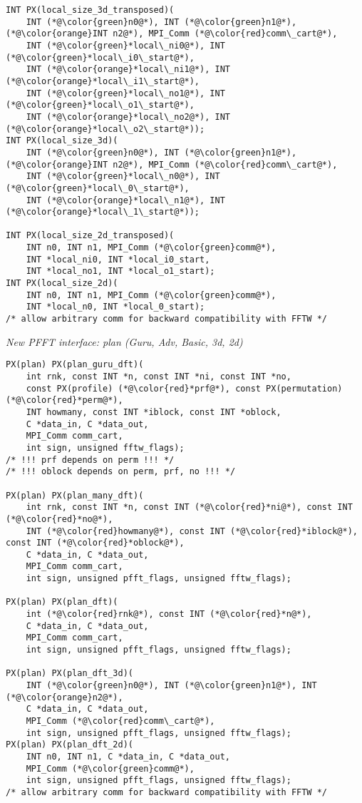 \begin{lstlisting}
INT PX(local_size_3d_transposed)(
    INT (*@\color{green}n0@*), INT (*@\color{green}n1@*), (*@\color{orange}INT n2@*), MPI_Comm (*@\color{red}comm\_cart@*),
    INT (*@\color{green}*local\_ni0@*), INT (*@\color{green}*local\_i0\_start@*),
    INT (*@\color{orange}*local\_ni1@*), INT (*@\color{orange}*local\_i1\_start@*),
    INT (*@\color{green}*local\_no1@*), INT (*@\color{green}*local\_o1\_start@*),
    INT (*@\color{orange}*local\_no2@*), INT (*@\color{orange}*local\_o2\_start@*));
INT PX(local_size_3d)(
    INT (*@\color{green}n0@*), INT (*@\color{green}n1@*), (*@\color{orange}INT n2@*), MPI_Comm (*@\color{red}comm\_cart@*),
    INT (*@\color{green}*local\_n0@*), INT (*@\color{green}*local\_0\_start@*),
    INT (*@\color{orange}*local\_n1@*), INT (*@\color{orange}*local\_1\_start@*));

INT PX(local_size_2d_transposed)(
    INT n0, INT n1, MPI_Comm (*@\color{green}comm@*),
    INT *local_ni0, INT *local_i0_start,
    INT *local_no1, INT *local_o1_start);
INT PX(local_size_2d)(
    INT n0, INT n1, MPI_Comm (*@\color{green}comm@*),
    INT *local_n0, INT *local_0_start);
/* allow arbitrary comm for backward compatibility with FFTW */
\end{lstlisting}


\emph{New PFFT interface: plan (Guru, Adv, Basic, 3d, 2d)}
\begin{lstlisting}
PX(plan) PX(plan_guru_dft)(
    int rnk, const INT *n, const INT *ni, const INT *no,
    const PX(profile) (*@\color{red}*prf@*), const PX(permutation) (*@\color{red}*perm@*),
    INT howmany, const INT *iblock, const INT *oblock,
    C *data_in, C *data_out,
    MPI_Comm comm_cart,
    int sign, unsigned fftw_flags);
/* !!! prf depends on perm !!! */
/* !!! oblock depends on perm, prf, no !!! */

PX(plan) PX(plan_many_dft)(
    int rnk, const INT *n, const INT (*@\color{red}*ni@*), const INT (*@\color{red}*no@*),
    INT (*@\color{red}howmany@*), const INT (*@\color{red}*iblock@*), const INT (*@\color{red}*oblock@*),
    C *data_in, C *data_out,
    MPI_Comm comm_cart,
    int sign, unsigned pfft_flags, unsigned fftw_flags);

PX(plan) PX(plan_dft)(
    int (*@\color{red}rnk@*), const INT (*@\color{red}*n@*),
    C *data_in, C *data_out,
    MPI_Comm comm_cart,
    int sign, unsigned pfft_flags, unsigned fftw_flags);

PX(plan) PX(plan_dft_3d)(
    INT (*@\color{green}n0@*), INT (*@\color{green}n1@*), INT (*@\color{orange}n2@*),
    C *data_in, C *data_out,
    MPI_Comm (*@\color{red}comm\_cart@*),
    int sign, unsigned pfft_flags, unsigned fftw_flags);
PX(plan) PX(plan_dft_2d)(
    INT n0, INT n1, C *data_in, C *data_out,
    MPI_Comm (*@\color{green}comm@*),
    int sign, unsigned pfft_flags, unsigned fftw_flags);
/* allow arbitrary comm for backward compatibility with FFTW */
\end{lstlisting}

